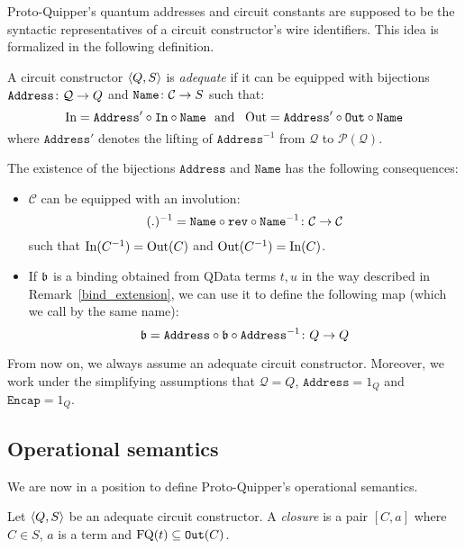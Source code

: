 \documentclass[twoside]{article}
\begin{document}
Proto-Quipper's quantum addresses and circuit constants are supposed 
to be the syntactic representatives of a circuit constructor's wire 
identifiers. This idea is formalized in the following definition.

\begin{definition}
A circuit constructor $\langle Q,S\rangle$ is \emph{adequate} if it can 
be equipped with bijections $\mathtt{Address}\colon \mathcal{Q} \to Q$ 
and $\mathtt{Name}\colon \mathcal{C} \to S$ such that:
\[\mathop{\textrm{In}}\nolimits=\mathtt{Address}' \circ\mathtt{In}\circ \mathtt{Name} 
~\mbox{ and }~ 
\mathop{\textrm{Out}}\nolimits=\mathtt{Address}'\circ\mathtt{Out}\circ \mathtt{Name}
\]
where $\mathtt{Address}'$ denotes the lifting of $\mathtt{Address}^{-1}$ 
from $\mathcal{Q}$ to $\mathcal{P}(\mathcal{Q})$.
\end{definition}

\begin{remark}
\label{structure-transfer}
The existence of the bijections $\mathtt{Address}$ and $\mathtt{Name}$ has 
the following consequences:
\begin{itemize}
  \item $\mathcal{C}$ can be equipped with an involution:
\[
(.)^{-1} = \mathtt{Name}\circ \mathtt{rev} \circ \mathtt{Name}^{-1}
           \colon \mathcal{C}\to\mathcal{C}
\]
such that $\mathop{\textrm{In}}\nolimits(C^{-1})=\mathop{\textrm{Out}}\nolimits(C)$ and 
$\mathop{\textrm{Out}}\nolimits(C^{-1})=\mathop{\textrm{In}}\nolimits(C)$.
  \item If $\mathfrak{b}$ is a binding obtained from QData terms $t,u$ in the 
  way described in Remark~\hyperref[bind_extension]{\ref*{bind_extension}}, 
  we can use it to define the following map (which we call by the same name):
  \[
  \mathfrak{b} = \mathtt{Address}\circ \mathfrak{b}\circ \mathtt{Address}^{-1}\colon Q\to Q
  \]
\end{itemize}

From now on, we always assume an adequate circuit constructor. Moreover, we work 
under the simplifying assumptions that $\mathcal{Q}=Q$, $\mathtt{Address}=1_Q$ 
and $\mathtt{Encap}=1_Q$.
\end{remark}


\subsection{Operational semantics}

We are now in a position to define Proto-Quipper's operational 
semantics.

\begin{definition}
Let $\langle Q,S\rangle$ be an adequate circuit constructor. A 
\emph{closure} is a pair $[C,a]$ where $C\in S$, $a$ is a 
term and $\mathop{\textrm{FQ}}\nolimits(t)\subseteq\mathtt{Out}(C)$. 
\end{definition}
\end{document}
